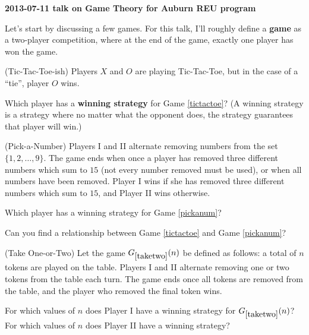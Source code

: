 



\centerline{\bf 2013-07-11 talk on Game Theory for Auburn REU program}

Let's start by discussing a few games. For this talk, I'll roughly define a \textbf{game} as a two-player competition, where at the end of the game, exactly one player has won the game.

\begin{game}{(Tic-Tac-Toe-ish)}\label{tictactoe}
Players $X$ and $O$ are playing Tic-Tac-Toe, but in the case of a ``tie'', player $O$ wins.
\end{game}

\begin{question}
Which player has a \textbf{winning strategy} for Game \ref{tictactoe}? (A winning strategy is a strategy where no matter what the opponent does, the strategy guarantees that player will win.)
\end{question}

\begin{game}{(Pick-a-Number)}\label{pickanum}
Players I and II alternate removing numbers from the set $\{1,2,\dots,9\}$. The game ends when once a player has removed three different numbers which sum to $15$ (not every number removed must be used), or when all numbers have been removed. Player I wins if she has removed three different numbers which sum to $15$, and Player II wins otherwise.
\end{game}

\begin{question}
Which player has a winning strategy for Game \ref{pickanum}?
\end{question}

\begin{question}
Can you find a relationship between Game \ref{tictactoe} and Game \ref{pickanum}?
\end{question}

\begin{game}{(Take One-or-Two)}\label{taketwo}
Let the game $G_{\ref{taketwo}}(n)$ be defined as follows: a total of $n$ tokens are played on the table. Players I and II alternate removing one or two tokens from the table each turn. The game ends once all tokens are removed from the table, and the player who removed the final token wins.
\end{game}

\begin{question}
For which values of $n$ does Player I have a winning strategy for $G_{\ref{taketwo}}(n)$? For which values of $n$ does Player II have a winning strategy?
\end{question}

